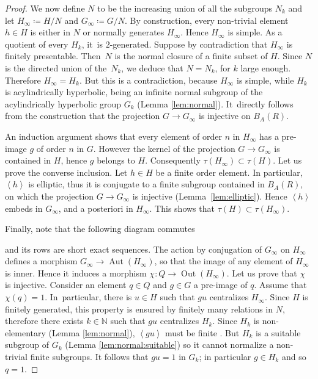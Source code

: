 \documentclass[11pt]{article}
\theoremstyle{definition}
\newcommand{\Aut}{\operatorname{Aut}}
\newcommand{\Out}{\operatorname{Out}}
\begin{document}
\begin{proof}
We now define $N$ to be the increasing union of all the subgroups $N_k$ and let $H_\infty \coloneqq H/N$ and $G_\infty \coloneqq G/N$.
By construction, every non-trivial element $h \in H$ is either in $N$ or normally generates $H_\infty$.
Hence $H_\infty$ is simple.
As a quotient of every $H_k$, it~is $2$-generated.
Suppose by contradiction that $H_\infty$ is finitely presentable.
Then~$N$ is the normal closure of a finite subset of $H$.
Since $N$ is the directed union of the~$N_k$, we deduce that $N = N_k$, for $k$ large enough.
Therefore $H_\infty = H_k$.
But this is a contradiction, because $H_\infty$ is simple, while $H_k$ is acylindrically hyperbolic, being an infinite normal subgroup of the acylindrically hyperbolic group $G_k$ (Lemma \ref{lem:normal}).
It~directly follows from the construction that the projection $G \to G_\infty$ is injective on $B_A(R)$.

An induction argument shows that every element of order $n$ in $H_\infty$ has a pre-image $g$ of order $n$ in $G$.
However the kernel of the projection $G \to G_\infty$ is contained in $H$, hence $g$ belongs to $H$.
Consequently $\tau(H_\infty) \subset \tau(H)$.
Let us prove the converse inclusion.
Let $h \in H$ be a finite order element.
In particular, $\left<h \right>$ is elliptic, thus it is conjugate to a finite subgroup contained in $B_A(R)$, on which the projection $G \to G_\infty$ is injective (Lemma~\ref{lem:elliptic}).
Hence $\left< h \right>$ embeds in $G_\infty$, and a posteriori in $H_\infty$. This shows that $\tau(H) \subset \tau(H_\infty)$.

Finally, note that the following diagram commutes
\begin{center}
\end{center}
and its rows are short exact sequences.
The action by conjugation of $G_\infty$ on $H_\infty$ defines a morphism $G_\infty \to \Aut(H_\infty)$, so that the image of any element of $H_\infty$ is inner.
Hence it induces a morphism $\chi \colon Q \to \Out(H_\infty)$.
Let us prove that $\chi$ is injective.
Consider an element $q \in Q$ and $g \in G$ a pre-image of $q$.
Assume that $\chi(q) = 1$.
In~particular, there is $u \in H$ such that $gu$ centralizes $H_\infty$.
Since $H$ is finitely generated, this property is ensured by finitely many relations in $N$, therefore there exists $k \in \mathbb N$ such that $gu$ centralizes $H_k$.
Since $H_k$ is non-elementary (Lemma \ref{lem:normal}), $\left<gu\right>$ must be finite \cite[Prop.\,6]{WPD}. But $H_k$ is a suitable subgroup of $G_k$ (Lemma \ref{lem:normal:suitable}) so it cannot normalize a non-trivial finite subgroups. It follows that $gu = 1$ in $G_k$; in particular $g \in H_k$ and so $q = 1$.
\end{proof}
\end{document}
